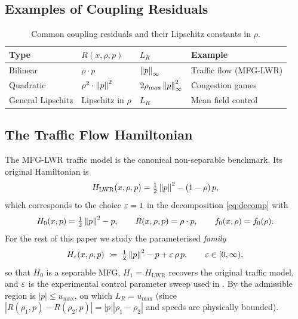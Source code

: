 \subsection{Examples of Coupling Residuals}

\begin{table}[h]
\centering
\begin{tabular}{llll}
\toprule
Type & $R(x,\rho,p)$ & $L_R$ & Example \\
\midrule
Bilinear & $\rho \cdot p$ & $\left\lVert p \right\rVert_\infty$ & Traffic flow (MFG-LWR) \\
Quadratic & $\rho^2 \cdot \left\lVert p \right\rVert^2$ & $2\rho_{\max}\left\lVert p \right\rVert_\infty^2$ & Congestion games \\
General Lipschitz & Lipschitz in $\rho$ & $L_R$ & Mean field control \\
\bottomrule
\end{tabular}
\caption{Common coupling residuals and their Lipschitz constants in $\rho$.}
\label{tab:coupling}
\end{table}

\subsection{The Traffic Flow Hamiltonian}
\label{sec:traffic}

The MFG-LWR traffic model \citep{huang2019mfg} is the canonical
non-separable benchmark.  Its original Hamiltonian is
\[
  H_{\mathrm{LWR}}(x,\rho,p) = \tfrac{1}{2}\left\lVert p \right\rVert^2 - (1-\rho)\,p,
\]
which corresponds to the choice $\varepsilon=1$ in the decomposition
\eqref{eq:decomp} with
\[
  H_0(x,p) = \tfrac{1}{2}\left\lVert p \right\rVert^2 - p,
  \qquad
  R(x,\rho,p) = \rho\cdot p,
  \qquad
  f_0(x,\rho) = f_0(\rho).
\]
For the rest of this paper we study the parameterised \emph{family}
\begin{equation}\label{eq:Heps}
  H_\varepsilon(x,\rho,p) \;\coloneqq\; \tfrac{1}{2}\left\lVert p \right\rVert^2 - p + \varepsilon\,\rho\,p,
  \qquad \varepsilon \in [0,\infty),
\end{equation}
so that $H_0$ is a separable MFG, $H_1 = H_{\mathrm{LWR}}$ recovers the
original traffic model, and $\varepsilon$ is the experimental control parameter
sweep used in .
By  the admissible region is $|p|\leq u_{\max}$, on which
$L_R = u_{\max}$ (since $|R(\rho_1,p)-R(\rho_2,p)|=|p||\rho_1-\rho_2|$
and speeds are physically bounded).

